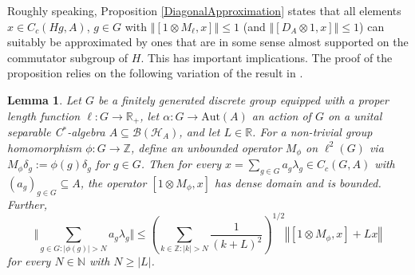 \documentclass[a4paper,11pt,reqno]{amsart}
\numberwithin{equation}{section}
\numberwithin{equation}{section}
\newtheorem{lemma}[theorem]{Lemma}
\theoremstyle{definition}
\theoremstyle{remark}
\theoremstyle{remark}
\begin{document}
Roughly speaking, Proposition \ref{DiagonalApproximation} states
that all elements $x\in C_{c}(Hg,A)$, $g\in G$ with $\left\Vert [1\otimes M_{\ell},x]\right\Vert \leq1$
(and $\left\Vert [D_{A}\otimes1,x]\right\Vert \leq1$) can suitably
be approximated by ones that are in some sense almost supported on
the commutator subgroup of $H$. This has important implications.
The proof of the proposition relies on the following variation of
the result in \cite[Section 2]{OzawaRieffel}.

\begin{lemma} \label{OzawaRieffel} Let $G$ be a finitely generated
discrete group equipped with a proper length function $\ell:G\rightarrow\mathbb{R}_{+}$,
let $\alpha:G\rightarrow\text{Aut}(A)$ an action of $G$ on a unital
separable C$^{\ast}$-algebra $A\subseteq\mathcal{B}(\mathcal{H}_{A})$,
and let $L\in\mathbb{R}$. For a non-trivial group homomorphism $\phi:G\rightarrow\mathbb{Z}$,
define an unbounded operator $M_{\phi}$ on $\ell^{2}(G)$ via $M_{\phi}\delta_{g}:=\phi(g)\delta_{g}$
for $g\in G$. Then for every $x=\sum_{g\in G}a_{g}\lambda_{g}\in C_{c}(G,A)$
with $(a_{g})_{g\in G}\subseteq A$, the operator $[1\otimes M_{\phi},x]$
has dense domain and is bounded. Further, 
\[
\Vert\sum_{g\in G:\left|\phi(g)\right|>N}a_{g}\lambda_{g}\Vert\leq\left(\sum_{k\in\mathbb{Z}:\left|k\right|>N}\frac{1}{(k+L)^{2}}\right)^{1/2}\left\Vert [1\otimes M_{\phi},x] + Lx \right\Vert 
\]
for every $N\in\mathbb{N}$ with $N\geq\left|L\right|$. \end{lemma}
\end{document}
